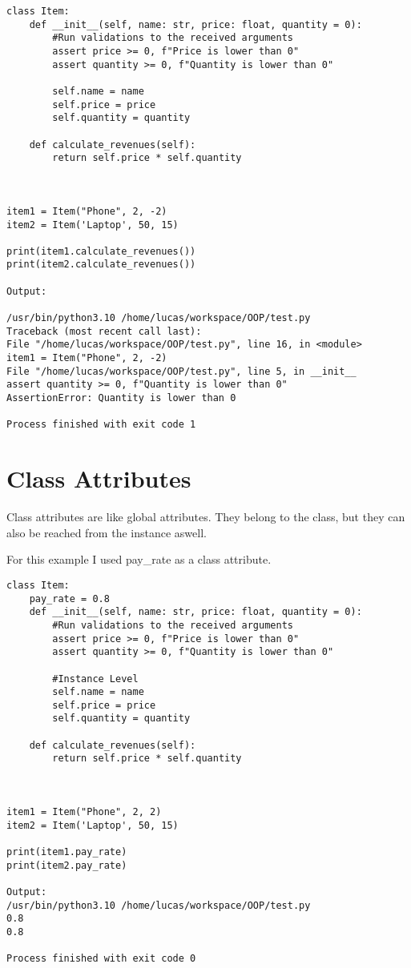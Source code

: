 \documentclass{article}
\begin{document}
\begin{lstlisting}
class Item:   
    def __init__(self, name: str, price: float, quantity = 0):
		#Run validations to the received arguments
		assert price >= 0, f"Price is lower than 0"
		assert quantity >= 0, f"Quantity is lower than 0"
		
		self.name = name
		self.price = price
		self.quantity = quantity
	
	def calculate_revenues(self):
		return self.price * self.quantity
	


item1 = Item("Phone", 2, -2)
item2 = Item('Laptop', 50, 15)

print(item1.calculate_revenues())
print(item2.calculate_revenues())

Output:

/usr/bin/python3.10 /home/lucas/workspace/OOP/test.py 
Traceback (most recent call last):
File "/home/lucas/workspace/OOP/test.py", line 16, in <module>
item1 = Item("Phone", 2, -2)
File "/home/lucas/workspace/OOP/test.py", line 5, in __init__
assert quantity >= 0, f"Quantity is lower than 0"
AssertionError: Quantity is lower than 0

Process finished with exit code 1
\end{lstlisting}

\section{Class Attributes}
Class attributes are like global attributes. They belong to the class, but they can also be reached from the instance aswell. 

For this example I used pay\_rate as a class attribute.

\begin{lstlisting}
class Item:
	pay_rate = 0.8
	def __init__(self, name: str, price: float, quantity = 0):
		#Run validations to the received arguments
		assert price >= 0, f"Price is lower than 0"
		assert quantity >= 0, f"Quantity is lower than 0"
	
		#Instance Level
		self.name = name
		self.price = price
		self.quantity = quantity
		
	def calculate_revenues(self):
		return self.price * self.quantity
	


item1 = Item("Phone", 2, 2)
item2 = Item('Laptop', 50, 15)

print(item1.pay_rate)
print(item2.pay_rate)

Output:
/usr/bin/python3.10 /home/lucas/workspace/OOP/test.py 
0.8
0.8

Process finished with exit code 0
	
\end{lstlisting}
\end{document}
